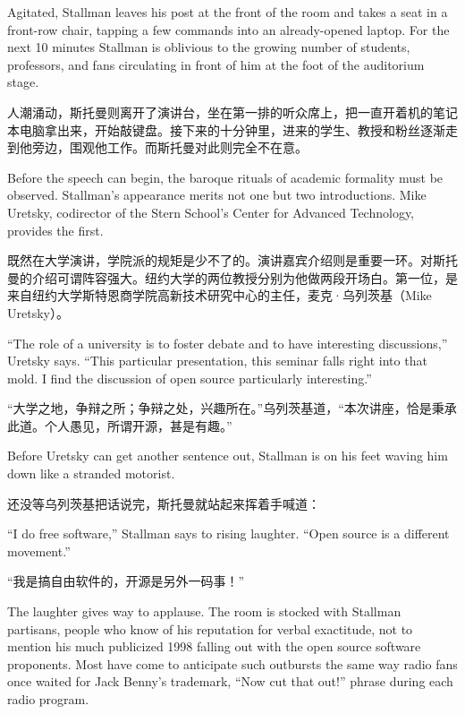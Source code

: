 \ifdefined\eng
Agitated, Stallman leaves his post at the front of the room and takes a seat in a front-row chair, tapping a few commands into an already-opened laptop. For the next 10 minutes Stallman is oblivious to the growing number of students, professors, and fans circulating in front of him at the foot of the auditorium stage.
\fi

\ifdefined\chs
人潮涌动，斯托曼则离开了演讲台，坐在第一排的听众席上，把一直开着机的笔记本电脑拿出来，开始敲键盘。接下来的十分钟里，进来的学生、教授和粉丝逐渐走到他旁边，围观他工作。而斯托曼对此则完全不在意。
\fi

\ifdefined\eng
Before the speech can begin, the baroque rituals of academic formality must be observed. Stallman's appearance merits not one but two introductions. Mike Uretsky, codirector of the Stern School's Center for Advanced Technology, provides the first.
\fi

\ifdefined\chs
既然在大学演讲，学院派的规矩是少不了的。演讲嘉宾介绍则是重要一环。对斯托曼的介绍可谓阵容强大。纽约大学的两位教授分别为他做两段开场白。第一位，是来自纽约大学斯特恩商学院高新技术研究中心的主任，麦克·乌列茨基（Mike Uretsky）。
\fi

\ifdefined\eng
``The role of a university is to foster debate and to have interesting discussions,'' Uretsky says. ``This particular presentation, this seminar falls right into that mold. I find the discussion of open source particularly interesting.''
\fi

\ifdefined\chs
``大学之地，争辩之所；争辩之处，兴趣所在。''乌列茨基道，``本次讲座，恰是秉承此道。个人愚见，所谓开源，甚是有趣。''
\fi

\ifdefined\eng
Before Uretsky can get another sentence out, Stallman is on his feet waving him down like a stranded motorist.
\fi

\ifdefined\chs
还没等乌列茨基把话说完，斯托曼就站起来挥着手喊道：
\fi

\ifdefined\eng
``I do free software,'' Stallman says to rising laughter. ``Open source is a different movement.''
\fi

\ifdefined\chs
``我是搞自由软件的，开源是另外一码事！''
\fi

\ifdefined\eng
The laughter gives way to applause. The room is stocked with Stallman partisans, people who know of his reputation for verbal exactitude, not to mention his much publicized 1998 falling out with the open source software proponents. Most have come to anticipate such outbursts the same way radio fans once waited for Jack Benny's trademark, ``Now cut that out!'' phrase during each radio program.
\fi

